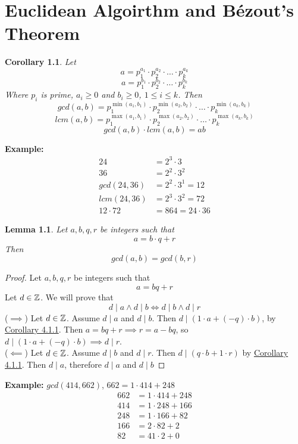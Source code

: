 \documentclass[openany]{report}
\newtheorem{corollary}{Corollary}[section]
\newtheorem{lemma}{Lemma}[section]
\begin{document}
\chapter{Euclidean Algoirthm and B\'ezout's Theorem}
\begin{corollary}\label{corollary6.0.1}
    Let 
    $$a = p_1^{a_1} \cdot p_2^{a_2} \cdot \ldots \cdot p_k^{a_k}$$
    $$a = p_1^{b_1} \cdot p_2^{b_2} \cdot \ldots \cdot p_k^{b_k}$$
    Where $p_i$ is prime, $a_i \geq 0$ and $b_i \geq 0$, $1 \leq i \leq k$. Then 
    $$gcd(a,b) = p_1^{\min(a_1,b_1)} \cdot p_2^{\min(a_2,b_2)} \cdot \ldots \cdot p_k^{\min(a_k,b_k)}$$
    $$lcm(a,b) = p_1^{\max(a_1,b_1)} \cdot p_2^{\max(a_2,b_2)} \cdot \ldots \cdot p_k^{\max(a_k,b_k)}$$
    $$gcd(a,b) \cdot lcm(a,b) = ab$$
\end{corollary}
\textbf{Example:} 
\begin{align*}
    24 &= 2^3 \cdot 3\\
    36 &= 2^2 \cdot 3^2\\
    gcd(24,36) &= 2^2 \cdot 3^1 = 12\\
    lcm(24,36) &= 2^3 \cdot 3^2 = 72\\
    12 \cdot 72 &= 864 = 24 \cdot 36
\end{align*}
\begin{lemma}\label{lemma6.0.1}
    Let $a,b,q,r$ be integers such that 
    $$a = b\cdot q + r$$
    Then 
    $$gcd(a,b)=gcd(b,r)$$
\end{lemma}
\begin{proof}
     Let $a,b,q,r$ be integers such that 
     $$a = bq + r$$
     Let $d \in \mathbb{Z}$. We will prove that 
    $$d \mid a \wedge d \mid b \iff d \mid b \wedge d\mid r$$
    ($\implies$) Let $d \in \mathbb{Z}$. Assume $d \mid a$ and $d \mid b$. Then $d \mid (1 \cdot a + (-q)\cdot b)$, by \hyperref[corollary4.1.1]{Corollary 4.1.1}. Then $a = bq + r \implies r = a -bq$, so $d \mid (1 \cdot a + (-q)\cdot b) \implies d \mid r$.\\[2ex]
    ($\impliedby$) Let $d \in \mathbb{Z}$. Assume $d \mid b$ and $d \mid r$. Then $d \mid (q\cdot b + 1 \cdot r)$ by \hyperref[corollary4.1.1]{Corollary 4.1.1}. Then $d \mid a$, therefore $d \mid a$ and $d \mid b$
\end{proof}
\textbf{Example:} $gcd(414,662)$, $662 = 1 \cdot 414 + 248$
\begin{align*}
    662 &= 1 \cdot 414 + 248\\
    414 &= 1 \cdot 248 + 166\\
    248 &= 1 \cdot 166 + 82\\
    166 &= 2 \cdot 82 + 2 \\
    82 &= 41 \cdot 2 + 0
\end{align*}
\end{document}
